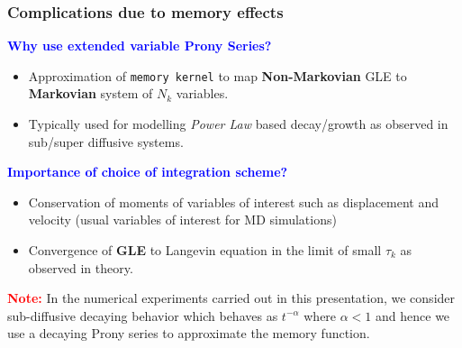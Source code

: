 \documentclass[a4paper,10pt]{beamer}
\begin{document}
	\begin{frame}
		\frametitle{Complications due to memory effects}
		\small
		\textcolor{blue}{\textbf{Why use extended variable Prony Series?}}
		
		\begin{itemize}
			\item {Approximation of \texttt{memory kernel} to map {\textbf{Non-Markovian}} GLE to {\textbf{Markovian}} system of $N_{k}$ variables.}
			\item {Typically used for modelling \textit{Power Law} based decay/growth as observed in sub/super diffusive systems.}
		\end{itemize}
		
		\textcolor{blue}{\textbf{Importance of choice of integration scheme?}}
		
		\begin{itemize}
			\item {Conservation of moments of variables of interest such as displacement and velocity (usual variables of interest for MD simulations)}
			\item {Convergence of \textbf{GLE} to Langevin equation in the limit of small $\tau_{k}$ as observed in theory.}
		\end{itemize}
	
		\textcolor{red}{\textbf{Note:}} In the numerical experiments carried out in this presentation, we consider sub-diffusive decaying behavior which behaves as $t^{-\alpha}$ where $\alpha < 1$ and hence we use a decaying Prony series to approximate the memory function.
	\end{frame}
\end{document}
